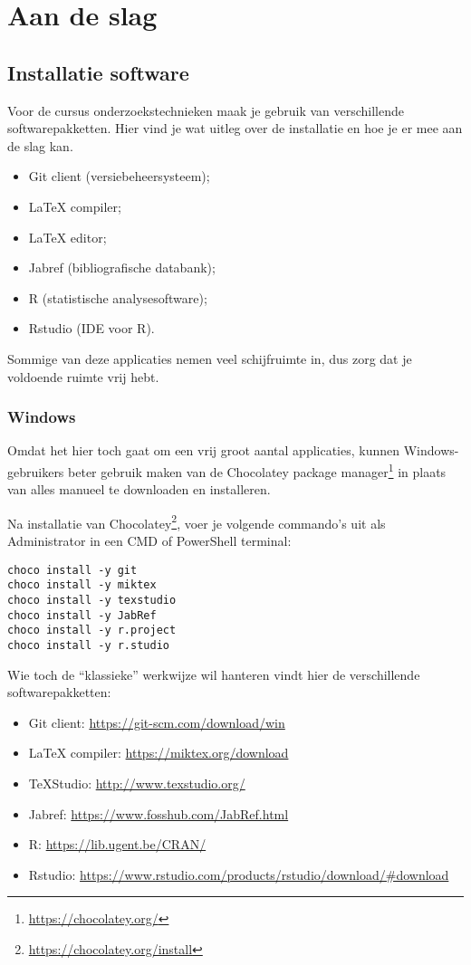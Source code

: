 \chapter{Aan de slag}
\label{ch:aan-de-slag}

\section{Installatie software}

Voor de cursus onderzoekstechnieken maak je gebruik van verschillende softwarepakketten. Hier vind je wat uitleg over de installatie en hoe je er mee aan de slag kan.

\begin{itemize}
  \item Git client (versiebeheersysteem);
  \item \LaTeX{} compiler;
  \item \LaTeX{} editor;
  \item Jabref (bibliografische databank);
  \item R (statistische analysesoftware);
  \item Rstudio (IDE voor R).
\end{itemize}

Sommige van deze applicaties nemen veel schijfruimte in, dus zorg dat je voldoende ruimte vrij hebt.

\subsection{Windows}

Omdat het hier toch gaat om een vrij groot aantal applicaties, kunnen Windows-gebruikers beter gebruik maken van de Chocolatey package manager\footnote{\url{https://chocolatey.org/}} in plaats van alles manueel te downloaden en installeren.

Na installatie van Chocolatey\footnote{\url{https://chocolatey.org/install}}, voer je volgende commando's uit als Administrator in een CMD of PowerShell terminal:

\begin{verbatim}
choco install -y git
choco install -y miktex
choco install -y texstudio
choco install -y JabRef
choco install -y r.project
choco install -y r.studio
\end{verbatim}

Wie toch de ``klassieke'' werkwijze wil hanteren vindt hier de verschillende softwarepakketten:

\begin{itemize}
  \item Git client: \url{https://git-scm.com/download/win}
  \item \LaTeX{} compiler: \url{https://miktex.org/download}
  \item TeXStudio: \url{http://www.texstudio.org/}
  \item Jabref: \url{https://www.fosshub.com/JabRef.html}
  \item R: \url{https://lib.ugent.be/CRAN/}
  \item Rstudio: \url{https://www.rstudio.com/products/rstudio/download/#download}
\end{itemize}

